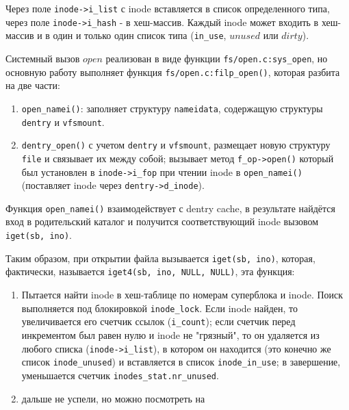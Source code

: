 Через поле \verb|inode->i_list| с inode вставляется в список определенного типа, через поле \verb|inode->i_hash| - в хеш-массив. Каждый inode может входить в хеш-массив и в один и только один список типа (\verb|in_use|, $unused$ или $dirty$).

Системный вызов $open$ реализован в виде функции \verb|fs/open.c:sys_open|, но основную работу выполняет функция \verb|fs/open.c:filp_open()|, которая разбита на две части:
\begin{enumerate}
	\item \verb|open_namei()|: заполняет структуру \verb|nameidata|, содержащую структуры \verb|dentry| и \verb|vfsmount|.
	\item \verb|dentry_open()| с учетом \verb|dentry| и \verb|vfsmount|, размещает новую структуру \verb|file| и связывает их между собой; вызывает метод \verb|f_op->open()| который был установлен в \verb|inode->i_fop| при чтении inode в \verb|open_namei()| (поставляет inode через \verb|dentry->d_inode|).
\end{enumerate}

Функция \verb|open_namei()| взаимодействует с dentry cache, в результате найдётся вход в родительский каталог и получится соответствующий inode вызовом \verb|iget(sb, ino)|.

Таким образом, при открытии файла вызывается \verb|iget(sb, ino)|, которая, фактически, называется \verb|iget4(sb, ino, NULL, NULL)|, эта функция:
\begin{enumerate}
	\item Пытается найти inode в хеш-таблице по номерам суперблока и inode. Поиск выполняется под блокировкой \verb|inode_lock|. Если inode найден, то увеличивается его счетчик ссылок (\verb|i_count|); если счетчик перед инкрементом был равен нулю и inode не "грязный", то он удаляется из любого списка (\verb|inode->i_list|), в котором он находится (это конечно же список \verb|inode_unused|) и вставляется в список \verb|inode_in_use|; в завершение, уменьшается счетчик \verb|inodes_stat.nr_unused|.
	\item дальше не успели, но можно посмотреть на \cite{rus-linux.net_VFS}
\end{enumerate}


